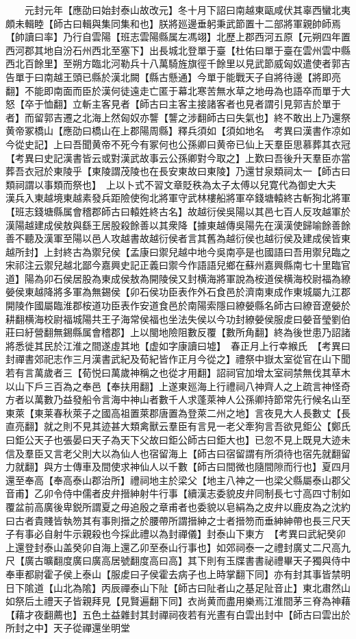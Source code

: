　　元封元年【應劭曰始封泰山故改元】冬十月下詔曰南越東甌咸伏其辜西蠻北夷頗未輯睦【師古曰輯與集同集和也】朕將廵邊垂躬秉武節置十二部將軍親帥師焉【帥讀曰率】乃行自雲陽【班志雲陽縣属左馮翊】北歷上郡西河五原【元朔四年置西河郡其地自汾石州西北至塞下】出長城北登單于臺【杜佑曰單于臺在雲州雲中縣西北百餘里】至朔方臨北河勒兵十八萬騎旌旗徑千餘里以見武節威匈奴遣使者郭吉告單于曰南越王頭已縣於漢北闕【縣古懸通】今單于能戰天子自將待邊【將即亮翻】不能即南面而臣於漢何徒遠走亡匿于幕北寒苦無水草之地毋為也語卒而單于大怒【卒于恤翻】立斬主客見者【師古曰主客主接諸客者也見者謂引見郭吉於單于者】而留郭吉遷之北海上然匈奴亦讋【讋之涉翻師古曰失氣也】終不敢出上乃還祭黄帝冢橋山【應劭曰橋山在上郡陽周縣】釋兵須如【須如地名　考異曰漢書作凉如今從史記】上曰吾聞黄帝不死今有冢何也公孫卿曰黄帝已仙上天羣臣思慕葬其衣冠　【考異曰史記漢書皆云或對漢武故事云公孫卿對今取之】上歎曰吾後升天羣臣亦當葬吾衣冠於東陵乎【東陵謂茂陵也在長安東故曰東陵】乃還甘泉類祠太一【師古曰類祠謂以事類而祭也】　上以卜式不習文章貶秩為太子太傅以兒寛代為御史大夫　漢兵入東越境東越素發兵距險使徇北將軍守武林樓船將軍卒錢塘轅終古斬狥北將軍【班志錢塘縣属會稽郡師古曰轅姓終古名】故越衍侯吳陽以其邑七百人反攻越軍於漢陽越建成侯敖與繇王居股殺餘善以其衆降【據東越傳吳陽先在漢漢使歸喻餘善餘善不聽及漢軍至陽以邑人攻越書故越衍侯者言其舊為越衍侯也越衍侯及建成侯皆東越所封】上封終古為禦兒侯【孟康曰禦兒越中地今吳南亭是也國語曰吾用禦兒臨之宋祁注云禦兒越北鄙今嘉興史記正義曰禦今作語語兒鄉在蘇州嘉興縣南七十里臨官道】陽為卯石侯居股為東成侯敖為開陵侯又封横海將軍說為桉道侯横海校尉福為繚嫈侯東越降將多軍為無錫侯【卯石侯功臣表作外石食邑於濟南東成作東城屬九江郡開陵作國屬臨淮郡桉道功臣表作安道食邑於南陽索隱曰繚嫈縣名師古曰繚音遼嫈於耕翻横海校尉福城陽共王子海常侯福也坐法失侯以今功封繚嫈侯服䖍曰嫈音瑩劉伯莊曰紆營翻無錫縣属會稽郡】上以閩地險阻數反覆【數所角翻】終為後世患乃詔諸將悉徙其民於江淮之間遂虛其地【虚如字康讀曰墟】　春正月上行幸緱氏　【考異曰封禪書郊祀志作三月漢書武紀及荀紀皆作正月今從之】禮祭中嶽太室從官在山下聞若有言萬歲者三【荀悦曰萬歲神稱之也從才用翻】詔祠官加增太室祠禁無伐其草木以山下戶三百為之奉邑【奉扶用翻】上遂東廵海上行禮祠八神齊人之上疏言神怪奇方者以萬數乃益發船令言海中神山者數千人求蓬萊神人公孫卿持節常先行候名山至東萊【東莱春秋萊子之國高祖置萊郡唐置為登萊二州之地】言夜見大人長數丈【長直亮翻】就之則不見其迹甚大類禽獸云羣臣有言見一老父牽狗言吾欲見鉅公【鄭氏曰鉅公天子也張晏曰天子為天下父故曰鉅公師古曰鉅大也】已忽不見上既見大迹未信及羣臣又言老父則大以為仙人也宿留海上【師古曰宿留謂有所須待也宿先就翻留力就翻】與方士傳車及間使求神仙人以千數【師古曰間微也隨間隙而行也】夏四月還至奉高【奉高泰山郡治所】禮祠地主於梁父【地主八神之一也梁父縣屬泰山郡父音甫】乙卯令侍中儒者皮弁搢紳射牛行事【續漢志委貌皮弁同制長七寸高四寸制如覆盆前高廣後卑鋭所謂夏之毋追殷之章甫者也委貌以皂絹為之皮弁以鹿皮為之沈約曰古者貴賤皆執笏其有事則搢之於腰帶所謂搢紳之士者搢笏而垂紳紳帶也長三尺天子有事必自射牛示親殺也今採此禮以為封禪儀】封泰山下東方　【考異曰武紀癸卯上還登封泰山盖癸卯自海上還乙卯至泰山行事也】如郊祠泰一之禮封廣丈二尺高九尺【廣古曠翻度廣曰廣高居號翻度高曰高】其下則有玉牒書書祕禮畢天子獨與侍中奉車都尉霍子侯上泰山【服䖍曰子侯霍去病子也上時掌翻下同】亦有封其事皆禁明日下隂道【山北為隂】丙辰禪泰山下阯【師古曰阯者山之基足阯音止】東北肅然山如祭后土禮天子皆親拜見【見賢遍翻下同】衣尚黄而盡用樂焉江淮間茅三脊為神藉【藉才夜翻薦也】五色土益雜封其封禪祠夜若有光晝有白雲出封中【師古曰雲出於所封之中】天子從禪還坐明堂